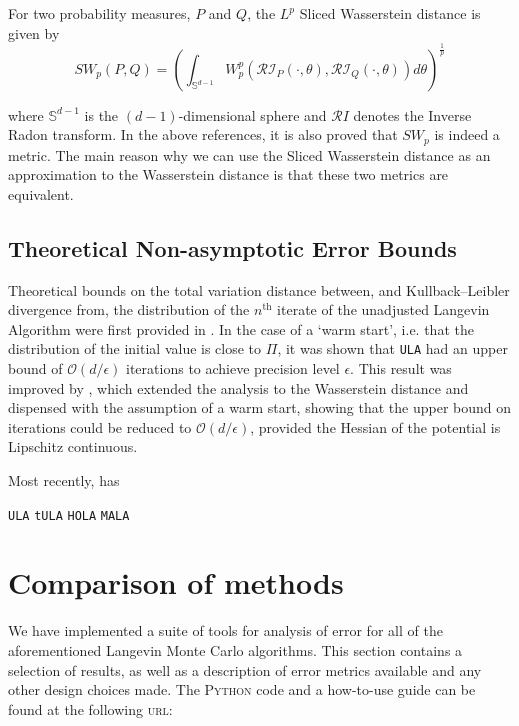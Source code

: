 \begin{defn}
For two probability measures, $P$ and $Q$, the $L^p$ Sliced Wasserstein distance is given by
$$
SW_p(P,Q) = \left(\int_{\mathbb S^{d-1} }  W_p^p\left(\mathcal{RI}_P(\cdot, \theta), \mathcal{RI}_Q(\cdot, \theta) \right) d \theta \right)^{\frac 1 p}
$$
\end{defn}

where $\mathbb S^{d-1}$ is the $(d-1)$-dimensional sphere and $\mathcal RI$ denotes the Inverse Radon transform. In the above references, it is also proved that $SW_p$ is indeed a metric. The main reason why we can use the Sliced Wasserstein distance as an approximation to the Wasserstein distance is that these two metrics are equivalent\cite{Santa}.


\subsection{Theoretical Non-asymptotic Error Bounds}


Theoretical bounds on the total variation distance between, and Kullback--Leibler divergence from, the distribution of the $n^{\text{th}}$ iterate of the unadjusted Langevin Algorithm were first provided in \cite{dalalyan2017theoretical}.  In the case of a `warm start', i.e. that the distribution of the initial value is close to $\Pi$, it was shown that \texttt{ULA} had an upper bound of $\mathcal{O}(d/\epsilon)$ iterations to achieve precision level $\epsilon$.  This result was improved by \cite{durmus2016high}, \cite{durmus2017nonasymptotic} which extended the analysis to the Wasserstein distance and dispensed with the assumption of a warm start, showing that the upper bound on iterations could be reduced to $\mathcal O (d/\epsilon)$, provided the Hessian of the potential is Lipschitz continuous.

Most recently, \cite{dalalyan2019user} has 

\texttt{ULA} \cite{dalalyan2019user}
\texttt{tULA} \cite{Brosse18tULA}
\texttt{HOLA} \cite{Sabanis18tHOLA}
\texttt{MALA} \cite{bou2013nonasymptotic}



\section{Comparison of methods}
We have implemented a suite of tools for analysis of error for all of the aforementioned Langevin Monte Carlo algorithms. This section contains a selection of results, as well as a description of error metrics available and any other design choices made. The \textsc{Python} code and a how-to-use guide can be found at the following
\textsc{url}: \\

